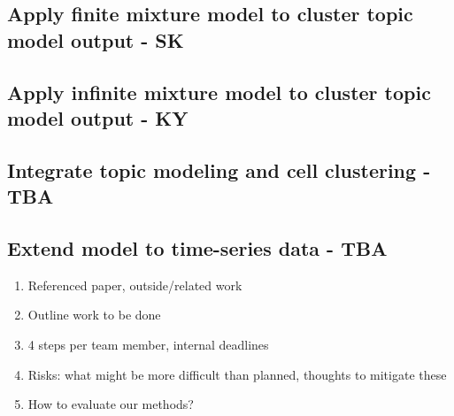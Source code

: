 \documentclass[11pt]{article}
\begin{document}
\subsection{Apply finite mixture model to cluster topic model output - SK}
\subsection{Apply infinite mixture model to cluster topic model output - KY}
\subsection{Integrate topic modeling and cell clustering - TBA}
\subsection{Extend model to time-series data - TBA}

\begin{enumerate}
    \item Referenced paper, outside/related work
    \item Outline work to be done
    \item 4 steps per team member, internal deadlines
    \item Risks: what might be more difficult than planned, thoughts to mitigate these
    \item How to evaluate our methods?
\end{enumerate}
\end{document}
